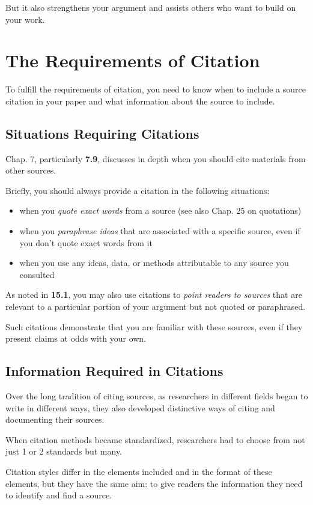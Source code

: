 \documentclass[oneside]{book}
\numberwithin{equation}{section}
\begin{document}
But it also strengthens your argument and assists others who want to build on your work.

\section{The Requirements of Citation}
To fulfill the requirements of citation, you need to know when to include a source citation in your paper and what information about the source to include.

\subsection{Situations Requiring Citations}
Chap. 7, particularly \textbf{7.9}, discusses in depth when you should cite materials from other sources.

Briefly, you should always provide a citation in the following situations:
\begin{itemize}
    \item when you \textit{quote exact words} from a source (see also Chap. 25 on quotations)
    \item when you \textit{paraphrase ideas} that are associated with a specific source, even if you don't quote exact words from it
    \item when you use any ideas, data, or methods attributable to any source you consulted
\end{itemize}
As noted in \textbf{15.1}, you may also use citations to \textit{point readers to sources} that are relevant to a particular portion of your argument but not quoted or paraphrased.

Such citations demonstrate that you are familiar with these sources, even if they present claims at odds with your own.

\subsection{Information Required in Citations}
Over the long tradition of citing sources, as researchers in different fields began to write in different ways, they also developed distinctive ways of citing and documenting their sources.

When citation methods became standardized, researchers had to choose from not just 1 or 2 standards but many.

%
Citation styles differ in the elements included and in the format of these elements, but they have the same aim: to give readers the information they need to identify and find a source.
\end{document}
